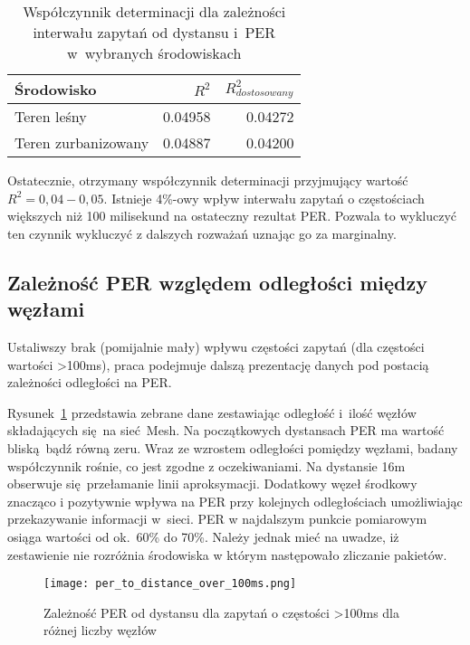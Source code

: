 \begin{table}[!ht]
\centering
	\begin{tabular}{p{4.5cm}|r|r}
	Środowisko              & $R^2$             & $R^2_{dostosowany}$\\\hline
	Teren leśny             & 0.04958           & 0.04272\\\hline
	Teren zurbanizowany     & 0.04887           & 0.04200\\\hline
	\end{tabular}
\caption{\label{tab:corr_between_ping_intervals}Współczynnik determinacji dla zależności interwału zapytań od dystansu i~PER w~wybranych środowiskach}
\end{table}

Ostatecznie, otrzymany współczynnik determinacji przyjmujący wartość $R^2=0,04-0,05$.  Istnieje 4\%-owy wpływ
interwału zapytań o częstościach większych niż 100 milisekund na ostateczny rezultat PER. Pozwala to
wykluczyć ten czynnik wykluczyć z dalszych rozważań uznając go za marginalny.

\subsection{Zależność PER względem odległości między węzłami}

Ustaliwszy brak (pomijalnie mały) wpływu częstości zapytań (dla częstości wartości >100ms), praca podejmuje dalszą prezentację
danych pod postacią zależności odległości na PER.

Rysunek~\ref{rys:per_to_distance_over_100ms} przedstawia zebrane dane zestawiając odległość i~ilość węzłów składających
się na sieć Mesh. Na początkowych dystansach PER ma wartość bliską bądź równą zeru. Wraz ze wzrostem odległości pomiędzy
węzłami, badany współczynnik rośnie, co jest zgodne z oczekiwaniami. Na dystansie 16m obserwuje się przełamanie
linii aproksymacji. Dodatkowy węzeł środkowy znacząco i pozytywnie wpływa na PER przy kolejnych odległościach
umożliwiając przekazywanie informacji w~sieci. PER w najdalszym punkcie pomiarowym osiąga wartości od ok.~60\% do 70\%.
Należy jednak mieć na uwadze, iż zestawienie nie rozróżnia środowiska w którym następowało zliczanie pakietów.


\begin{figure}[!htb]
	\centering \texttt{[image: per\_to\_distance\_over\_100ms.png]}
	\caption{Zależność \gls{PER} od dystansu dla zapytań o częstości >100ms dla różnej liczby węzłów}
	\label{rys:per_to_distance_over_100ms}
\end{figure}

